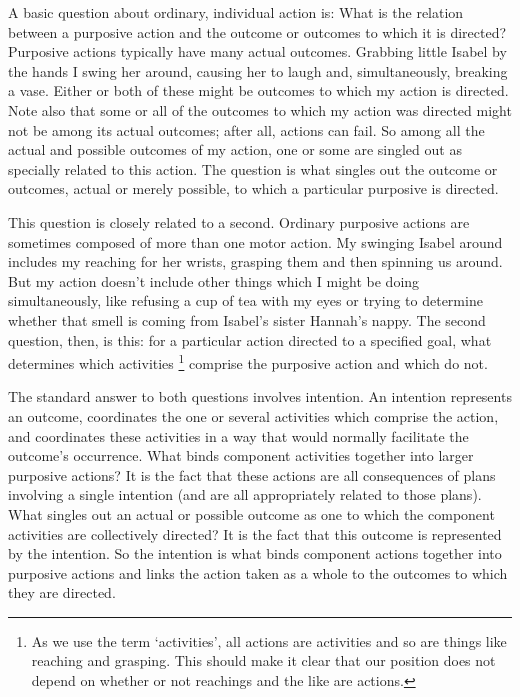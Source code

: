 \documentclass[12pt,\papersize]{extarticle}
\begin{document}
A basic question about ordinary, individual action is:
What is the relation between a purposive action and the outcome or outcomes to which it is directed?
Purposive actions typically have many actual outcomes.
Grabbing little Isabel by the hands I swing her around, causing her to laugh and, simultaneously, breaking a vase.
Either or both of these might be outcomes to which my action is directed.
Note also that some or all of the outcomes to which my action was directed might not be among its actual outcomes; after all, actions can fail.
So among all the actual and possible outcomes of my action, one or some are singled out as specially related to this action.
The question is what singles out the outcome or outcomes, actual or merely possible, to which a particular purposive is directed.

This question is closely related to a second.
Ordinary purposive actions are sometimes composed of more than one motor action.  My swinging Isabel around includes my reaching for her wrists, grasping them and then spinning us around.  
But  my action doesn’t include other things which I might be doing simultaneously, like refusing a cup of tea with my eyes or  trying to determine whether that smell is coming from Isabel’s sister Hannah’s nappy.
The second question, then, is this: for a particular action directed to a specified goal, what determines which activities%
\footnote{
As we use the term `activities',
all actions are activities 
and so are  things like reaching and grasping.
This should make it clear that our position does not depend on whether or not reachings and the like are  actions.
} comprise the purposive action and which do not.


The standard answer to both questions involves intention.
An intention represents an outcome, coordinates the one or several activities which comprise the action, and coordinates these activities in a way that would normally facilitate the outcome's occurrence.
What binds component activities together into larger purposive actions?  
It is the fact that these actions are all consequences of plans involving a single intention (and are all appropriately related to those plans).
What singles out an actual or possible outcome as one to which the component activities are collectively directed?  
It is the fact that this outcome is represented by the intention.
So the intention is what binds component actions together into purposive actions and links the action taken as a whole to the outcomes to which they are directed.
\end{document}
